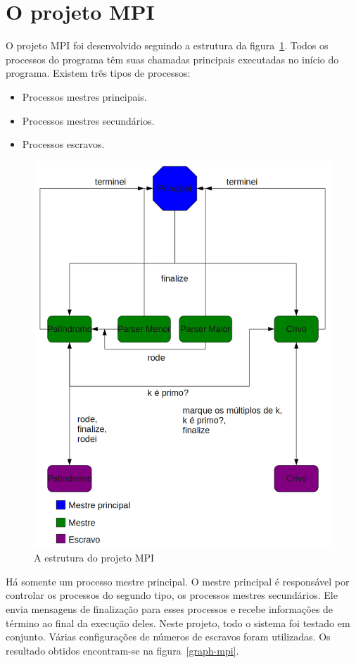 \documentclass[a4paper]{article}
\begin{document}
\section{O projeto MPI}
\indent \indent O projeto MPI foi desenvolvido seguindo a estrutura da figura~\ref{pic-mpi}. Todos os processos do programa têm suas chamadas principais executadas no início do programa. Existem três tipos de processos:
\begin{itemize}
	\item Processos mestres principais.
	\item Processos mestres secundários.
	\item Processos escravos.
\end{itemize}
\begin{figure}[float=p]
	\includegraphics[scale=0.5]{pic-mpi}
	\caption{A estrutura do projeto MPI}
	\label{pic-mpi}
\end{figure}
\indent \indent Há somente um processo mestre principal. O mestre principal é responsável por controlar os processos do segundo tipo, os processos mestres secundários. Ele envia mensagens de finalização para esses processos e recebe informações de término ao final da execução deles. Neste projeto, todo o sistema foi testado em conjunto. Várias configurações de números de escravos foram utilizadas. Os resultado obtidos encontram-se na figura~\ref{graph-mpi}.
\end{document}
